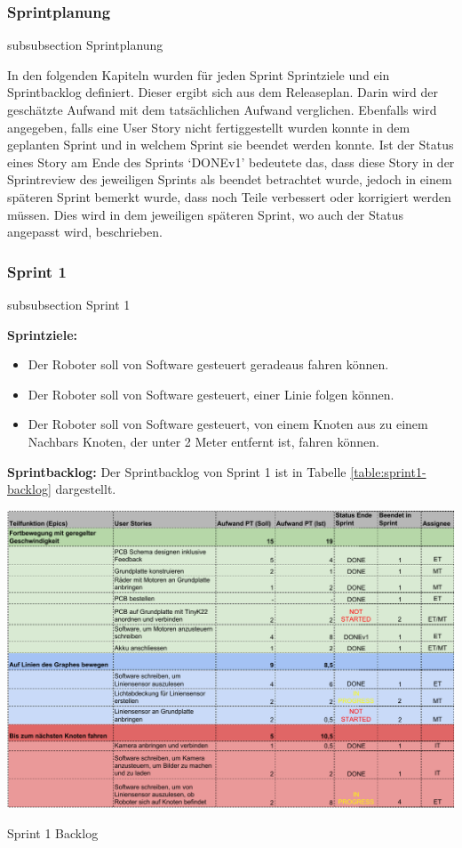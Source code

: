 \subsubsection*{Sprintplanung}
    {subsubsection}
    {Sprintplanung}

    
In den folgenden Kapiteln wurden für jeden Sprint Sprintziele und ein Sprintbacklog definiert. Dieser ergibt sich aus dem Releaseplan. Darin wird der geschätzte Aufwand mit dem tatsächlichen Aufwand verglichen. Ebenfalls wird angegeben, falls eine User Story nicht fertiggestellt wurden konnte in dem geplanten Sprint und in welchem Sprint sie beendet werden konnte. Ist der Status eines Story am Ende des Sprints `DONEv1' bedeutete das, dass diese Story in der Sprintreview des jeweiligen Sprints als beendet betrachtet wurde, jedoch in einem späteren Sprint bemerkt wurde, dass noch Teile verbessert oder korrigiert werden müssen. Dies wird in dem jeweiligen späteren Sprint, wo auch der Status angepasst wird, beschrieben. 


\subsubsection*{Sprint 1}
    {subsubsection}
    {Sprint 1}

\textbf{Sprintziele:}
\begin{itemize}
    \item Der Roboter soll von Software gesteuert geradeaus fahren können.
    \item Der Roboter soll von Software gesteuert, einer Linie folgen können.
    \item Der Roboter soll von Software gesteuert, von einem Knoten aus zu einem Nachbars Knoten, der unter 2 Meter entfernt ist, fahren können.
\end{itemize}

\textbf{Sprintbacklog:} Der Sprintbacklog von Sprint 1 ist in Tabelle 
\ref{table:sprint1-backlog} 
dargestellt.

\begin{table}[H]
\centering
\includegraphics[width=\textwidth]{assets/projektmanagement/sprint1-crop.pdf}
\caption{Sprint 1 Backlog}
\label{table:sprint1-backlog}
\end{table}

